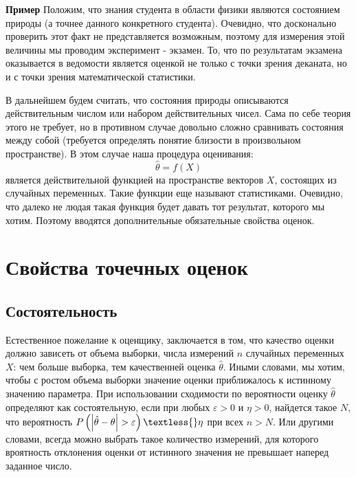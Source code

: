 \textbf{Пример} Положим, что знания студента в области физики являются
состоянием природы (а точнее данного конкретного студента). Очевидно,
что досконально проверить этот факт не представляется возможным, поэтому
для измерения этой величины мы проводим эксперимент - экзамен. То, что
по результатам экзамена оказывается в ведомости является оценкой не
только с точки зрения деканата, но и с точки зрения математической
статистики.

В дальнейшем будем считать, что состояния природы описываются
действительным числом или набором действительных чисел. Сама по себе
теория этого не требует, но в противном случае довольно сложно
сравнивать состояния между собой (требуется определять понятие близости
в произвольном пространстве). В этом случае наша процедура оценивания:
\begin{equation}
    \hat{\theta} = f(X)
\end{equation} является действительной функцией на пространстве векторов
$X$, состоящих из случайных переменных. Такие функции еще называют
статистиками. Очевидно, что далеко не людая такая функция будет давать
тот результат, которого мы хотим. Поэтому вводятся дополнительные
обязательные свойства оценок.

\section{Свойства точечных оценок}

\subsection{Состоятельность}

Естественное пожелание к оценщику, заключается в том, что качество
оценки должно зависеть от объема выборки, числа измерений $n$
случайных переменных $X$: чем больше выборка, тем качественней оценка
$\hat{\theta}$. Иными словами, мы хотим, чтобы с ростом объема выборки
значение оценки приближалось к истинному значению параметра. При
использовании сходимости по вероятности оценку $\hat{\theta}$
определяют как состоятельную, если при любых $\varepsilon > 0$ и
$\eta > 0$, найдется такое $N$, что вероятность $P \left(
\left| \hat{\theta} - \theta \right| > \varepsilon \right) \textless{} \eta $ при всех $n > N$. Или другими
словами, всегда можно выбрать такое количество измерений, для которого
вроятность отклонения оценки от истинного значения не превышает наперед
заданное число.


